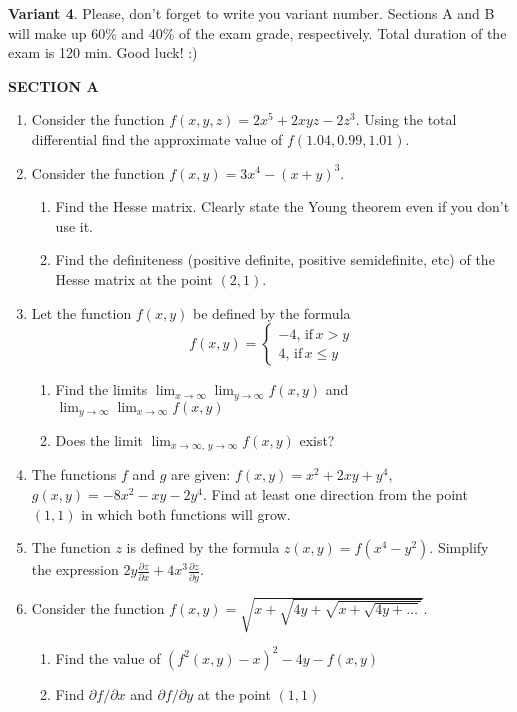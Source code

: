 \documentclass[12pt,a4paper]{article}
\begin{document}
\newpage
\thispagestyle{empty}
\textbf{Variant 4}. Please, don't forget to write you variant number. Sections A and B will make up 60\% and 40\% of the exam grade, respectively. Total duration of the exam is 120 min. Good luck! :) 



\textbf{SECTION A}

\begin{enumerate}

\item Consider the function $f(x,y,z)=2x^5+2xyz-2z^3$. Using the total differential find the approximate value of $f(1.04,0.99,1.01)$.

\item Consider the function $f(x,y)=3x^4-(x+y)^3$. 
\begin{enumerate}
\item Find the Hesse matrix. Clearly state the Young theorem even if you don't use it.
\item Find the definiteness (positive definite, positive semidefinite, etc) of the Hesse matrix at the point $(2,1)$.
\end{enumerate}

\item Let the function $f(x,y)$ be defined by the formula
\[
f(x,y)=\begin{cases}
-4, \, \text{if} \, x>y \\
4, \, \text{if} \, x\leq y
\end{cases}
\]

\begin{enumerate}
\item Find the limits $\lim_{x\to\infty}\lim_{y\to \infty} f(x,y)$ and $\lim_{y\to\infty}\lim_{x\to \infty} f(x,y)$
\item Does the limit $\lim_{x\to\infty, \, y\to \infty} f(x,y)$ exist?
\end{enumerate}


\item The functions $f$ and $g$ are given: $f(x,y)=x^2+2xy+y^4$, $g(x,y)=-8x^2-xy-2y^4$. Find at least one direction from the point $(1,1)$ in which both functions will grow.

\item The function $z$ is defined by the formula $z(x,y)=f(x^4-y^2)$. Simplify the expression $2y\frac{\partial z}{\partial x}+4x^3\frac{\partial z}{\partial y}$. 

\item Consider the function $f(x,y)=\sqrt{x+\sqrt{4y+\sqrt{x+\sqrt{4y + \ldots }}}}$. 
\begin{enumerate}
\item Find the value of $(f^2(x,y)-x)^2-4y-f(x,y)$
\item Find $\partial f/\partial x$ and $\partial f/\partial y$ at the point $(1,1)$
\end{enumerate}


\end{enumerate}
\end{document}
